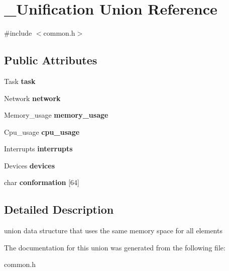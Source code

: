\hypertarget{union__Unification}{}\section{\+\_\+\+Unification Union Reference}
\label{union__Unification}


{\ttfamily \#include $<$common.\+h$>$}

\subsection*{Public Attributes}
\begin{DoxyCompactItemize}
\item 
Task {\bfseries task}\hypertarget{union__Unification_a3f9e9fdee396a8ff964c60d3e53f6903}{}\label{union__Unification_a3f9e9fdee396a8ff964c60d3e53f6903}

\item 
Network {\bfseries network}\hypertarget{union__Unification_a739950665dedcc938c6cf80c0f806f93}{}\label{union__Unification_a739950665dedcc938c6cf80c0f806f93}

\item 
Memory\+\_\+usage {\bfseries memory\+\_\+usage}\hypertarget{union__Unification_aeff6506725731a6035981c74fd92f28c}{}\label{union__Unification_aeff6506725731a6035981c74fd92f28c}

\item 
Cpu\+\_\+usage {\bfseries cpu\+\_\+usage}\hypertarget{union__Unification_a6df55009d450d87e1020590eef1a0010}{}\label{union__Unification_a6df55009d450d87e1020590eef1a0010}

\item 
Interrupts {\bfseries interrupts}\hypertarget{union__Unification_a8d4c9130fbbfa5651a301dbd64c48274}{}\label{union__Unification_a8d4c9130fbbfa5651a301dbd64c48274}

\item 
Devices {\bfseries devices}\hypertarget{union__Unification_af46be7c8513027957494f77b12124267}{}\label{union__Unification_af46be7c8513027957494f77b12124267}

\item 
char {\bfseries conformation} \mbox{[}64\mbox{]}\hypertarget{union__Unification_a1e4cb1a474efc3e492718c6b250a99cc}{}\label{union__Unification_a1e4cb1a474efc3e492718c6b250a99cc}

\end{DoxyCompactItemize}


\subsection{Detailed Description}
union data structure that uses the same memory space for all elements 

The documentation for this union was generated from the following file\+:\begin{DoxyCompactItemize}
\item 
common.\+h\end{DoxyCompactItemize}
